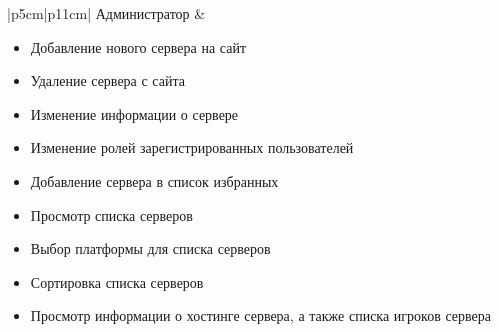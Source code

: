 \begin{table}[H]
\begin{tabular}{|p{5cm}|p{11cm}|}
        Администратор &
            \begin{minipage}[t]{\linewidth}
                \begin{itemize}[nosep,after=\strut]
                    \item Добавление нового сервера на сайт
                    \item Удаление сервера с сайта
                    \item Изменение информации о сервере
                    \item Изменение ролей зарегистрированных пользователей
                    \item Добавление сервера в список избранных
                    \item Просмотр списка серверов
                    \item Выбор платформы для списка серверов
                    \item Сортировка списка серверов
                    \item Просмотр информации о хостинге сервера, а также списка игроков сервера
                \end{itemize}
            \end{minipage} 
        \\ \hline
    \end{tabular}
\end{table}



